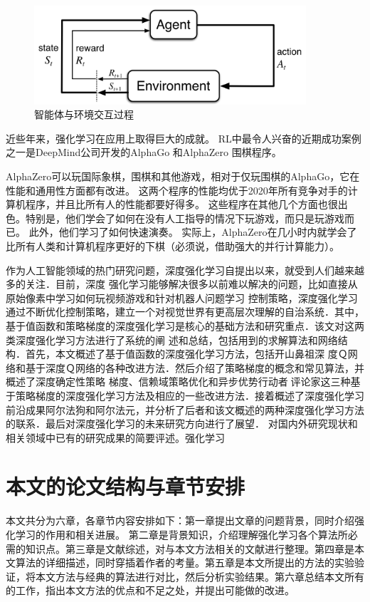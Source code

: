 \begin{figure}[h]
	\centering
	\includegraphics[width=0.9\textwidth]{image/chap01/interaction.png}
	\caption{智能体与环境交互过程\cite{suttonReinforcementLearningIntroduction2018}}
 	\label{fig:interaction-illustration}
\end{figure}

近些年来，强化学习在应用上取得巨大的成就。
RL中最令人兴奋的近期成功案例之一是DeepMind公司开发的AlphaGo \cite{silverMasteringGameGo2016} 和AlphaZero \cite{silverMasteringGameGo2017} 围棋程序。


AlphaZero可以玩国际象棋，围棋和其他游戏，相对于仅玩围棋的AlphaGo，它在性能和通用性方面都有改进。
这两个程序的性能均优于2020年所有竞争对手的计算机程序，并且比所有人的性能都要好得多。
这些程序在其他几个方面也很出色。特别是，他们学会了如何在没有人工指导的情况下玩游戏，而只是玩游戏而已。
此外，他们学习了如何快速演奏。
实际上，AlphaZero在几小时内就学会了比所有人类和计算机程序更好的下棋（必须说，借助强大的并行计算能力）。

作为人工智能领域的热门研究问题，深度强化学习自提出以来，就受到人们越来越多的关注．目前，深度 强化学习能够解决很多以前难以解决的问题，比如直接从原始像素中学习如何玩视频游戏和针对机器人问题学习 控制策略，深度强化学习通过不断优化控制策略，建立一个对视觉世界有更高层次理解的自治系统．其中，基于值函数和策略梯度的深度强化学习是核心的基础方法和研究重点．该文对这两类深度强化学习方法进行了系统的阐 述和总结，包括用到的求解算法和网络结构．首先，本文概述了基于值函数的深度强化学习方法，包括开山鼻祖深 度Ｑ网络和基于深度Ｑ网络的各种改进方法．然后介绍了策略梯度的概念和常见算法，并概述了深度确定性策略 梯度、信赖域策略优化和异步优势行动者评论家这三种基于策略梯度的深度强化学习方法及相应的一些改进方法．接着概述了深度强化学习前沿成果阿尔法狗和阿尔法元，并分析了后者和该文概述的两种深度强化学习方法 的联系．最后对深度强化学习的未来研究方向进行了展望．
对国内外研究现状和相关领域中已有的研究成果的简要评述。强化学习 \cite{suttonReinforcementLearningIntroduction2018}




\section{本文的论文结构与章节安排}
\label{sec:arrangement}

本文共分为六章，各章节内容安排如下：第一章提出文章的问题背景，同时介绍强化学习的作用和相关进展。 第二章是背景知识，介绍理解强化学习各个算法所必需的知识点。第三章是文献综述，对与本文方法相关的文献进行整理。第四章是本文算法的详细描述，同时穿插着作者的考量。第五章是本文所提出的方法的实验验证，将本文方法与经典的算法进行对比，然后分析实验结果。第六章总结本文所有的工作，指出本文方法的优点和不足之处，并提出可能做的改进。
